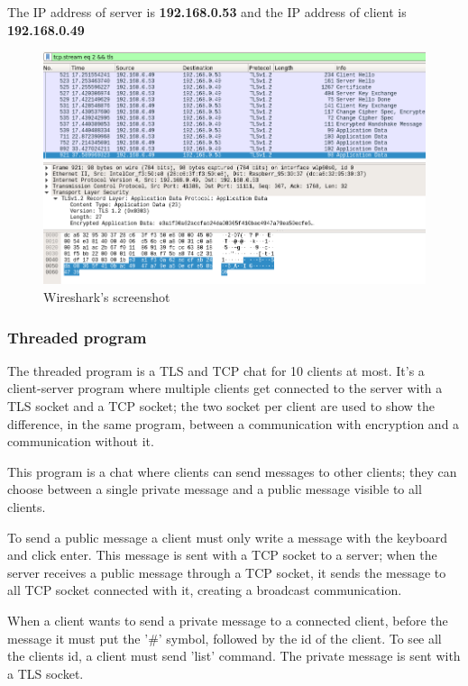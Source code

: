 \documentclass[a4paper,12pt]{article}
\begin{document}
The IP address of server is \textbf{192.168.0.53} and the IP address of client is \textbf{192.168.0.49}
\begin{figure}[H]
    \centering
    \includegraphics[scale=0.5]{./code/img/wireshark-iterative.png}
    \caption{Wireshark's screenshot}
    
\end{figure}
\subsubsection{Threaded program}
The threaded program is a TLS and TCP chat for 10 clients at most. It's a client-server program where multiple clients get connected to the server with a TLS socket and a TCP socket; the two socket per client are used to show the difference, in the same program, between a communication with encryption and a communication without it.

This program is a chat where clients can send messages to other clients; they can choose between a single private message and a public message visible to all clients. 

To send a public message a client must only write a message with the keyboard and click enter. This message is sent with a TCP socket to a server; when the server receives a public message through a TCP socket, it sends the message to all TCP socket connected with it, creating a broadcast communication.

When a client wants to send a private message to a connected client, before the message it must put the '\#' symbol, followed by the id of the client. To see all the clients id, a client must send 'list' command. The private message is sent with a TLS socket.
\end{document}
